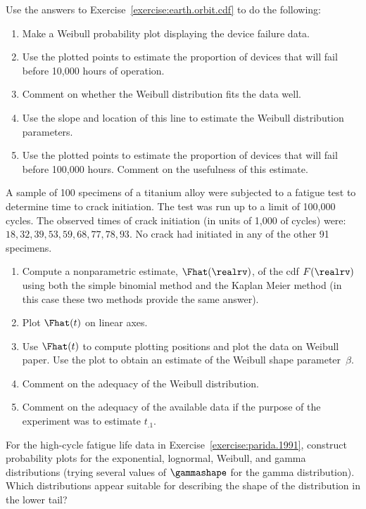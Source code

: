 \begin{exercise}
Use the answers to Exercise~\ref{exercise:earth.orbit.cdf}
to do the following:
\begin{enumerate}
\item
Make a Weibull probability plot displaying the
device failure data.
\item
Use the plotted points to estimate the proportion of devices that
will fail before 10,000 hours of operation.
\item
Comment on whether the Weibull distribution fits the data well.
\item
Use the slope and location of this line to estimate the Weibull
distribution parameters.
\item
Use the plotted points to estimate the proportion of devices that
will fail before 100,000 hours. Comment on the usefulness of this
estimate.
\end{enumerate}
\end{exercise}

\begin{exercise} 
\label{exercise:fatigue.experiment}
A sample of 100 specimens of a titanium alloy were subjected to a
fatigue test to determine time to crack initiation. The test was run
up to a limit of 100,000 cycles.  The observed times of crack
initiation (in units of 1,000 of cycles) were: $18, 32, 39, 53, 59,
68, 77, 78, 93$. No crack had initiated in any of the other 91
specimens.
\begin{enumerate}
\item
Compute a nonparametric estimate, $\Fhat(\realrv)$, of the cdf
$F(\realrv)$ using both the simple binomial method and the Kaplan
Meier method (in this case these two methods provide the same
answer).
\item
Plot $\Fhat(t)$ on linear axes.
\item
Use $\Fhat(t)$ to compute plotting positions and plot the data
on Weibull paper. Use the plot to obtain an
estimate of the Weibull shape parameter~$\beta$.
\item
Comment on the adequacy of the Weibull distribution.
\item
Comment on the adequacy of the available data if the purpose of the 
experiment was to estimate $t_{.1}$.
\end{enumerate}
\end{exercise}


\begin{exercise}
For the high-cycle fatigue life data in Exercise~\ref{exercise:parida.1991},
construct probability plots for the exponential, lognormal, Weibull,
and gamma distributions (trying several values of $\gammashape$
for the gamma distribution). Which distributions appear suitable for
describing the shape of the distribution in the lower tail?
\end{exercise}



